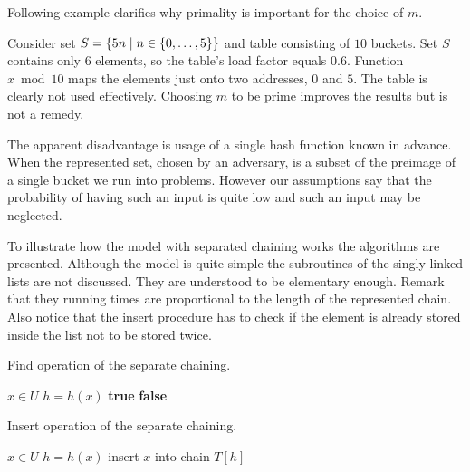Following example clarifies why primality is important for the choice of $m$.

\begin{example}
Consider set $S = \{5n \mid n \in \{0, \dots, 5\} \}$ and table consisting of $10$ buckets. Set $S$ contains only 6 elements, so the table's load factor equals $0.6$. Function $x \bmod 10$ maps the elements just onto two addresses, $0$ and $5$. The table is clearly not used effectively. Choosing $m$ to be prime improves the results but is not a remedy.
\end{example}

The apparent disadvantage is usage of a single hash function known in advance. When the represented set, chosen by an adversary, is a subset of the preimage of a single bucket we run into problems. However our assumptions say that the probability of having such an input is quite low and such an input may be neglected.

To illustrate how the model with separated chaining works the algorithms are presented. Although the model is quite simple the subroutines of the singly linked lists are not discussed. They are understood to be elementary enough. Remark that they running times are proportional to the length of the represented chain. Also notice that the insert procedure has to check if the element is already stored inside the list not to be stored twice. 

\begin{algorithm}
\caption{Find operation of the separate chaining.}
\label{algorithm-find-separate-chaining}
\begin{algorithmic}
\REQUIRE $x \in U$
\STATE $h = h(x)$
\STATE
{}
	\RETURN \textbf{true} 
\ELSE
	\RETURN \textbf{false} 
\ENDIF
\end{algorithmic}
\end{algorithm}

\begin{algorithm}
\caption{Insert operation of the separate chaining.}
\label{algorithm-insert-separate-chaining}
\begin{algorithmic}
\REQUIRE $x \in U$
\STATE $h = h(x)$
\STATE
{}
	\STATE insert $x$ into chain $T[h]$
\ENDIF
\end{algorithmic}
\end{algorithm}

